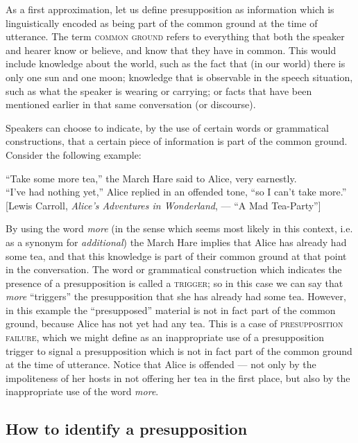 As a first approximation, let us define presupposition as information which is linguistically encoded as being part of the common ground at the time of utterance. The term \textsc{common ground} refers to everything that both the speaker and hearer know or believe, and know that they have in common. This would include knowledge about the world, such as the fact that (in our world) there is only one sun and one moon; knowledge that is observable in the speech situation, such as what the speaker is wearing or carrying; or facts that have been mentioned earlier in that same conversation (or discourse).



Speakers can choose to indicate, by the use of certain words or grammatical constructions, that a certain piece of information is part of the common ground. Consider the following example:


\ea \label{ex:3.10}
“Take some more tea,” the March Hare said to Alice, very earnestly.\\
“I’ve had nothing yet,” Alice replied in an offended tone, “so I can’t take more.”\\{}
{}[Lewis Carroll, \textit{Alice’s Adventures in Wonderland},  — “A Mad Tea-Party”]
\z


By using the word \textit{more} (in the sense which seems most likely in this context, i.e. as a synonym for \textit{additional}) the March Hare implies that Alice has already had some tea, and that this knowledge is part of their common ground at that point in the conversation. The word or grammatical construction which indicates the presence of a presupposition is called a \textsc{trigger}; so in this case we can say that \textit{more} “triggers” the presupposition that she has already had some tea. However, in this example the “presupposed” material is not in fact part of the common ground, because Alice has not yet had any tea. This is a case of \textsc{presupposition failure}, which we might define as an inappropriate use of a presupposition trigger to signal a presupposition which is not in fact part of the common ground at the time of utterance. Notice that Alice is offended — not only by the impoliteness of her hosts in not offering her tea in the first place, but also by the inappropriate use of the word \textit{more}.


\subsection{How to identify a presupposition}\label{sec:3.4.1}

